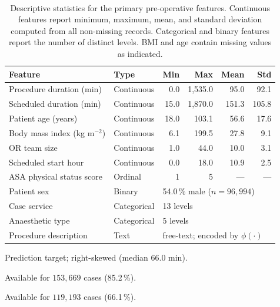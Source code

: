 \documentclass[3p]{elsarticle}
\begin{document}
\begin{table}[tp]
\centering
\caption{\\Descriptive statistics for the primary pre-operative features. Continuous features report minimum, maximum, mean, and standard deviation computed from all non-missing records. Categorical and binary features report the number of distinct levels. BMI and age contain missing values as indicated.}
\label{tab:dataset_desc}
\begin{threeparttable}
\begin{tabular}{llrrrr}
\toprule
Feature & Type & Min & Max & Mean & Std \\
\midrule
Procedure duration (min)\tnote{a} & Continuous & 0.0 & 1{,}535.0 & 95.0 & 92.1 \\
Scheduled duration (min) & Continuous & 15.0 & 1{,}870.0 & 151.3 & 105.8 \\
Patient age (years)\tnote{b} & Continuous & 18.0 & 103.1 & 56.6 & 17.6 \\
Body mass index (kg m$^{-2}$)\tnote{c} & Continuous & 6.1 & 199.5 & 27.8 & 9.1 \\
OR team size & Continuous & 1.0 & 44.0 & 10.0 & 3.1 \\
Scheduled start hour & Continuous & 0.0 & 18.0 & 10.9 & 2.5 \\
ASA physical status score & Ordinal & 1 & 5 & — & — \\
Patient sex & Binary & \multicolumn{4}{l}{54.0\,\% male ($n = 96{,}994$)} \\
Case service & Categorical & \multicolumn{4}{l}{13 levels} \\
Anaesthetic type & Categorical & \multicolumn{4}{l}{5 levels} \\
Procedure description & Text & \multicolumn{4}{l}{free-text; encoded by $\phi(\cdot)$} \\
\bottomrule
\end{tabular}
\begin{tablenotes}
\small
\item[a] Prediction target; right-skewed (median $66.0$ min).
\item[b] Available for $153{,}669$ cases (85.2\,\%).
\item[c] Available for $119{,}193$ cases (66.1\,\%).
\end{tablenotes}
\end{threeparttable}
\end{table}

\end{document}

